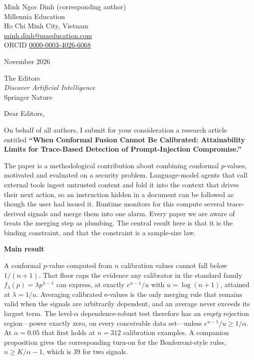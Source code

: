 \documentclass[10pt]{article}
\begin{document}
\noindent
Minh Ngoc Dinh (corresponding author)\\
Millennia Education\\
Ho Chi Minh City, Vietnam\\
\href{mailto:minh.dinh@maeducation.com}{minh.dinh@maeducation.com}\\
ORCID \href{https://orcid.org/0000-0003-4026-6068}{0000-0003-4026-6068}

\vspace{0.7em}
 November 2026

\vspace{0.7em}
\noindent
The Editors\\
\emph{Discover Artificial Intelligence}\\
Springer Nature

\vspace{0.8em}
\noindent Dear Editors,

\vspace{0.5em}
On behalf of all authors, I submit for your consideration a research article entitled \textbf{``When
Conformal Fusion Cannot Be Calibrated: Attainability Limits for Trace-Based
Detection of Prompt-Injection Compromise.''}

The paper is a methodological contribution about combining conformal $p$-values,
motivated and evaluated on a security problem. Language-model agents that call
external tools ingest untrusted content and fold it into the context that drives
their next action, so an instruction hidden in a document can be followed as though
the user had issued it. Runtime monitors for this compute several trace-derived
signals and merge them into one alarm. Every paper we are aware of treats the merging
step as plumbing. The central result here is that it is the binding constraint, and
that the constraint is a sample-size law.

\vspace{0.4em}
\noindent\textbf{Main result}

\vspace{0.3em}
A conformal $p$-value computed from $n$ calibration values cannot fall below
$1/(n{+}1)$. That floor caps the evidence any calibrator in the standard family
$f_\lambda(p) = \lambda p^{\lambda-1}$ can express, at exactly $e^{u-1}/u$ with
$u = \log(n{+}1)$, attained at $\lambda = 1/u$. Averaging calibrated e-values is
the only merging rule that remains valid when the signals are arbitrarily
dependent, and an average never exceeds its largest term. The level-$\alpha$
dependence-robust test therefore has an \emph{empty} rejection region---power
exactly zero, on every conceivable data set---unless $e^{u-1}/u \ge 1/\alpha$. At
$\alpha = 0.05$ that first holds at $n = 312$ calibration examples. A companion
proposition gives the corresponding turn-on for the Bonferroni-style rules,
$n \ge K/\alpha - 1$, which is $39$ for two signals.
\end{document}
